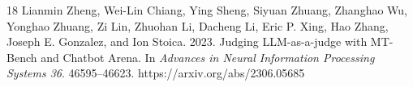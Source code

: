 \documentclass[sigconf]{acmart}
\begin{document}
\begin{thebibliography}{18}
Lianmin Zheng, Wei-Lin Chiang, Ying Sheng, Siyuan Zhuang, Zhanghao Wu, Yonghao Zhuang, Zi Lin, Zhuohan Li, Dacheng Li, Eric P. Xing, Hao Zhang, Joseph E. Gonzalez, and Ion Stoica. 2023. Judging LLM-as-a-judge with MT-Bench and Chatbot Arena. In \emph{Advances in Neural Information Processing Systems 36}. 46595--46623. https://arxiv.org/abs/2306.05685

\end{thebibliography}
\end{document}
